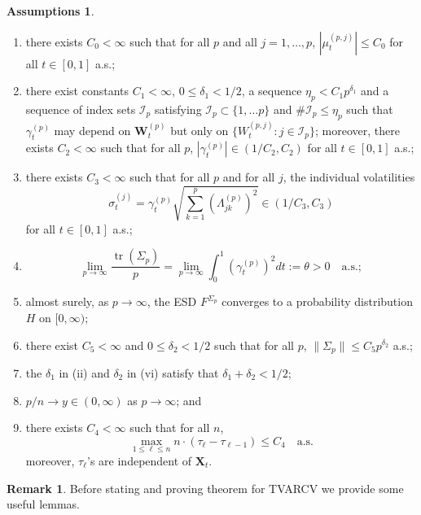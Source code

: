 \documentclass[a4paper,11pt]{article}
\theoremstyle{plain}
\theoremstyle{definition}
\newtheorem{rmrk}[thm]{Remark}
\newtheorem{asmp}[thm]{Assumptions}
\newcommand{\tr}{\operatorname{tr}}
\begin{document}
    \begin{asmp} \label{asmp2} \
    	\begin{enumerate}
    		\item there exists $C_0 < \infty$ such that for all $p$ and all $j = 1, \dots, p$, $|\mu_t^{(p,j)}| \leq C_0$ for all $t \in [0, 1]$ a.s.;
    		\item there exist constants $C_1 < \infty$, $0 \leq \delta_1 < 1/2$, a sequence $\eta_p < C_1 p^{\delta_1}$ and a sequence of index sets $\mathcal{I}_p$ satisfying $\mathcal{I}_p \subset \{ 1, \dots p \}$ and $\# \mathcal{I}_p \leq \eta_p$ such that $\gamma_t^{(p)}$ may depend on $\mathbf{W}_t^{(p)}$ but only on $\{ W_t^{(p, j)} : j \in \mathcal{I}_p \}$; moreover, there exists $C_2 < \infty$ such that for all $p$, $|\gamma_t^{(p)}| \in (1/C_2, C_2)$ for all $t \in [0, 1]$ a.s.;
    		\item there exists $C_3 < \infty$ such that for all $p$ and for all $j$, the individual volatilities \[ \sigma_t^{(j)} = \gamma_t^{(p)}\sqrt{\sum_{k=1}^{p} (\Lambda_{jk}^{(p)})^2} \in (1/C_3, C_3)\] for all $t \in [0, 1]$ a.s.;
    		\item \[ \lim_{p \rightarrow \infty} \frac{\tr(\Sigma_p)}{p} = \lim_{p \rightarrow \infty} \int_{0}^{1} (\gamma_t^{(p)})^2 dt := \theta > 0 \quad \text{a.s.}; \]
    		\item almost surely, as $p \rightarrow \infty$, the ESD $F^{\Sigma_p}$ converges to a probability distribution $H$ on $[0, \infty)$;
    		\item there exist $C_5 < \infty$ and $0 \leq \delta_2 < 1/2$ such that for all $p$, $\| \Sigma_p \| \leq C_5 p^{\delta_2}$ a.s.;
    		\item the $\delta_1$ in (ii) and $\delta_2$ in (vi) satisfy that $\delta_1 + \delta_2 < 1/2$;
    		\item $p/n \rightarrow y \in (0, \infty) $ as $p \rightarrow \infty$; and
    		\item there exists $C_4 < \infty$ such that for all $n$,
    		\[ \max_{1 \leq \ell \leq n} n \cdot (\tau_{\ell} - \tau_{\ell - 1}) \leq C_4 \quad \text{a.s.}  \]
    		moreover, $\tau_{\ell}$'s are independent of $\mathbf{X}_t$.
    	\end{enumerate}
    \end{asmp}
    
    \begin{rmrk}
    	Before stating and proving theorem for TVARCV we provide some useful lemmas.
    \end{rmrk}
    
\end{document}
